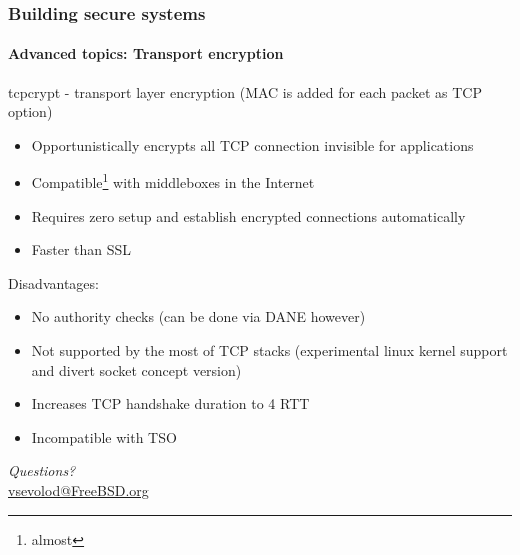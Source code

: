 \documentclass[11pt,t]{beamer}
\begin{document}
\begin{frame}[fragile]
\frametitle{Building secure systems}
\framesubtitle{Advanced topics: Transport encryption}
tcpcrypt - transport layer encryption (MAC is added for each packet as TCP option)
\begin{itemize}
\item Opportunistically encrypts all TCP connection invisible for applications
\item Compatible\footnote{almost} with middleboxes in the Internet
\item Requires zero setup and establish encrypted connections automatically
\item Faster than SSL
\end{itemize}
Disadvantages:
\begin{itemize}
\item No authority checks (can be done via DANE however)
\item Not supported by the most of TCP stacks (experimental linux kernel support and 
divert socket concept version)
\item Increases TCP handshake duration to 4 RTT
\item Incompatible with TSO
\end{itemize}
\end{frame}

\begin{frame}
\vfill\vfill\centering
\emph{Questions?} \\[4pt]
\url{vsevolod@FreeBSD.org}
\vfill\vfill
\end{frame}
\end{document}

